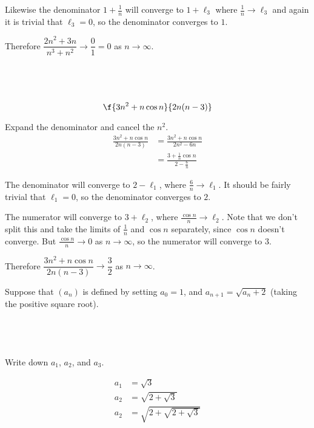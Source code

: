\documentclass[a4paper]{article}
\begin{document}
Likewise the denominator $1 + \frac1n$ will converge to $1 + \ell_3$ where $\frac1n \to \ell_3$ and again it is trivial that $\ell_3 = 0$, so the denominator converges to $1$.

Therefore $\dfrac{2n^2 + 3n}{n^3 + n^2} \to \dfrac01 = 0$ as $n \to \infty$.

\subsection{~} %

\begin{questionbody}
\[ \f{3n^2 + n\cos n}{2n (n-3)} \]
\end{questionbody}

Expand the denominator and cancel the $n^2$.
\begin{align*}
	\frac{3n^2 + n\cos n}{2n (n-3)} &= \frac{3n^2 + n\cos n}{2n^2 - 6n}\\[1ex]
									&= \frac{3 + \frac1n \cos n}{2 - \frac6n}
\end{align*}

The denominator will converge to $2 - \ell_1$, where $\frac6n \to \ell_1$. It should be fairly trivial that $\ell_1 = 0$, so the denominator converges to $2$.

The numerator will converge to $3 + \ell_2$, where $\frac{\cos n}{n} \to \ell_2$. Note that we don't split this and take the limits of $\frac1n$ and $\cos n$ separately, since $\cos n$ doesn't converge. But $\frac{\cos n}{n} \to 0$ as $n \to \infty$, so the numerator will converge to $3$.

Therefore $\dfrac{3n^2 + n\cos n}{2n (n-3)} \to \dfrac32$ as $n \to \infty$.


\renewcommand{\thesubsection}{Q\arabic{section}~(\roman{subsection})}


\begin{questionbody}
Suppose that $(a_n)$ is defined by setting $a_0 = 1$, and $a_{n + 1} = \sqrt{a_n + 2}$ (taking the positive square root).
\end{questionbody}

\subsection{~} %

\begin{questionbody}
Write down $a_1$, $a_2$, and $a_3$.
\end{questionbody}
%
\begin{align*}
	a_1 &= \sqrt3\\[1ex]
	a_2 &= \sqrt{2 + \sqrt3}\\[1ex]
	a_2 &= \sqrt{2 + \sqrt{2 + \sqrt3}}
\end{align*}
\end{document}
